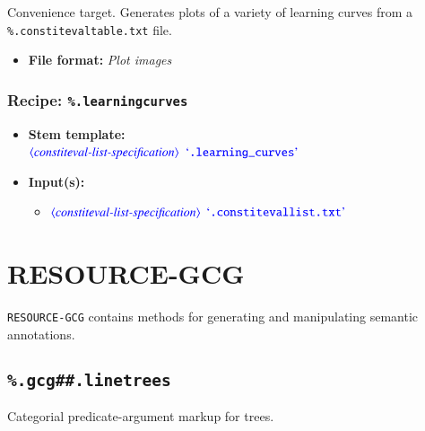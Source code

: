 \documentclass[12pt]{report}
\def\blue{\color{blue}}
\begin{document}
Convenience target. Generates plots of a variety of learning curves from a {\blue\tt \%.constitevaltable.txt} file.

\begin{itemize}
      \item \textbf{File format:} \textit{Plot images}
\end{itemize}

\subsection{Recipe: {\blue\tt \%.learning\textunderscore curves}}

\begin{itemize}
      \item \textbf{Stem template:}\\
      $\dtype{constiteval-list-specification}$ $\dcode{.learning\textunderscore curves}$
      \item \textbf{Input(s):}
      \begin{itemize}
            \item $\dtype{constiteval-list-specification}$ $\dcode{.constitevallist.txt}$
      \end{itemize}
\end{itemize}



\chapter{RESOURCE-GCG}

{\tt RESOURCE-GCG} contains methods for generating and manipulating semantic annotations.

\section{\blue\tt \%.gcg\#\#.linetrees}

Categorial predicate-argument markup for trees.
\end{document}
